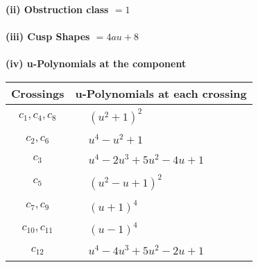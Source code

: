 \documentclass[1p]{elsarticle_modified}
\theoremstyle{definition}
\begin{document}
\flushleft \textbf{(ii) Obstruction class $= 1$}\\~\\
\flushleft \textbf{(iii) Cusp Shapes $= 4 a u+8$}\\~\\
\newpage\renewcommand{\arraystretch}{1}
\flushleft \textbf{(iv) u-Polynomials at the component}\newline \\
\begin{tabular}{m{50pt}|m{274pt}}
Crossings & \hspace{64pt}u-Polynomials at each crossing \\
\hline $$\begin{aligned}c_{1},c_{4},c_{8}\end{aligned}$$&$\begin{aligned}
&(u^2+1)^2
\end{aligned}$\\
\hline $$\begin{aligned}c_{2},c_{6}\end{aligned}$$&$\begin{aligned}
&u^4- u^2+1
\end{aligned}$\\
\hline $$\begin{aligned}c_{3}\end{aligned}$$&$\begin{aligned}
&u^4-2 u^3+5 u^2-4 u+1
\end{aligned}$\\
\hline $$\begin{aligned}c_{5}\end{aligned}$$&$\begin{aligned}
&(u^2- u+1)^2
\end{aligned}$\\
\hline $$\begin{aligned}c_{7},c_{9}\end{aligned}$$&$\begin{aligned}
&(u+1)^4
\end{aligned}$\\
\hline $$\begin{aligned}c_{10},c_{11}\end{aligned}$$&$\begin{aligned}
&(u-1)^4
\end{aligned}$\\
\hline $$\begin{aligned}c_{12}\end{aligned}$$&$\begin{aligned}
&u^4-4 u^3+5 u^2-2 u+1
\end{aligned}$\\
\hline
\end{tabular}\\~\\
\end{document}

